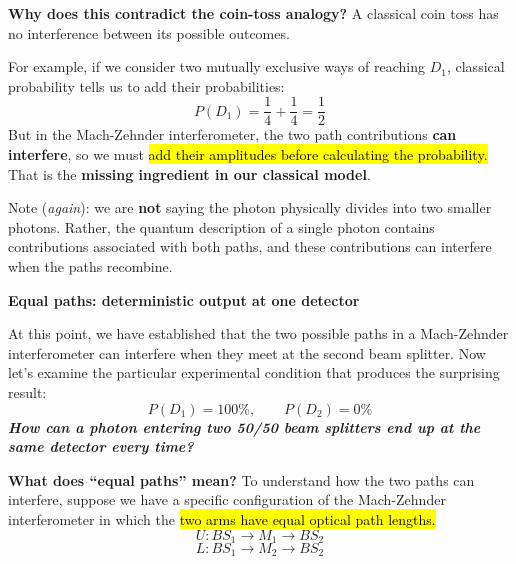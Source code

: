 \highspace
\textcolor{Green3}{ \textbf{Why does this contradict the coin-toss analogy?}} A classical coin toss has no interference between its possible outcomes.

\highspace
For example, if we consider two mutually exclusive ways of reaching $D_1$, classical probability tells us to add their probabilities:
\begin{equation*}
    P(D_1)=\frac{1}{4} + \frac{1}{4} = \frac{1}{2}
\end{equation*}
But in the Mach-Zehnder interferometer, the two path contributions \textbf{can interfere}, so we must \hl{add their amplitudes before calculating the probability.} That is the \textbf{missing ingredient in our classical model}.

\highspace
Note (\emph{again}): we are \textbf{not} saying the photon physically divides into two smaller photons. Rather, the quantum description of a single photon contains contributions associated with both paths, and these contributions can interfere when the paths recombine.

\newpage

\begin{flushleft}
    \textcolor{Green3}{ \textbf{Equal paths: deterministic output at one detector}}
\end{flushleft}
At this point, we have established that the two possible paths in a Mach-Zehnder interferometer can interfere when they meet at the second beam splitter. Now let's examine the particular experimental condition that produces the surprising result:
\begin{equation*}
    P\left(D_1\right)=100\%,\qquad P\left(D_2\right)=0\%
\end{equation*}
\emph{\textbf{How can a photon entering two 50/50 beam splitters end up at the same detector every time?}}

\highspace
\textcolor{Green3}{ \textbf{What does ``equal paths'' mean?}} To understand how the two paths can interfere, suppose we have a specific configuration of the Mach-Zehnder interferometer in which the \hl{two arms have equal optical path lengths.}
\begin{equation*}
    U : {BS}_{1} \to M_{1} \to {BS}_{2}
\end{equation*}
\begin{equation*}
    L : {BS}_{1} \to M_{2} \to {BS}_{2}
\end{equation*}


